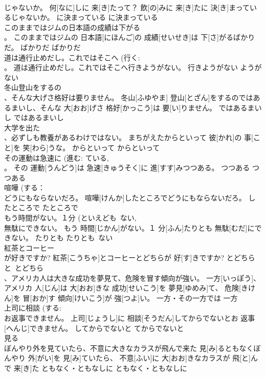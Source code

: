 \documentclass[8pt]{extreport}
\begin{document}
\begin{CJK}{UTF8}{min}
\\	じゃないか。	何[なに]しに 来[き]たって？ 飲[の]みに 来[き]たに 決[き]まっているじゃないか。	に決まっている	に決まっている	
\\	このままではジムの日本語の成績は下がる 
\\	。	このままではジムの 日本語[にほんご]の 成績[せいせき]は 下[さ]がるばかりだ。	ばかりだ	ばかりだ	
\\	道は通行止めだし。これではそこへ (行く: 
\\	。	道は通行止めだし。これではそこへ行きようがない。	行きようがない	ようがない	
\\	冬山登山をするの 
\\	、そんな大げさ格好は要りません。	冬山[ふゆやま] 登山[とざん]をするのではあるまいし、そんな 大[おお]げさ 格好[かっこう]は 要[い]りません。	ではあるまいし	ではあるまいし	
\\	大学を出た 
\\	、必ずしも教養があるわけではない。	まちがえたからといって 彼[かれ]の 事[こと]を 笑[わら]うな。	からといって	からといって	
\\	その運動は急速に (進む: ている, 
\\	。	その 運動[うんどう]は 急速[きゅうそく]に 進[すす]みつつある。	つつある	つつある	
\\	喧嘩 (する： 
\\	どうにもならないだろ。	喧嘩[けんか]したところでどうにもならないだろ。	したところで	たところで	
\\	もう時間がない。１分 (といえども~ない, 
\\	無駄にできない。	もう 時間[じかん]がない。１ 分[ふん]たりとも 無駄[むだ]にできない。	たりとも	たりとも~ない	
\\	紅茶とコーヒー 
\\	が好きですか?	紅茶[こうちゃ]とコーヒーとどちらが 好[す]きですか?	とどちら	と~とどちら	
\\	、アメリカ人は大きな成功を夢見て、危険を冒す傾向が強い。	一方[いっぽう]、アメリカ 人[じん]は 大[おお]きな 成功[せいこう]を 夢見[ゆめみ]て、 危険[きけん]を 冒[おか]す 傾向[けいこう]が 強[つよ]い。	一方・その一方では	一方	
\\	上司に相談 (する: 
\\	お返事できません。	上司[じょうし]に 相談[そうだん]してからでないとお 返事[へんじ]できません。	してからでないと	てからでないと	
\\	見る 
\\	ぼんやり外を見ていたら、不意に大きなカラスが飛んで来た	見[み]るともなくぼんやり 外[がい]を 見[み]ていたら、 不意[ふい]に 大[おお]きなカラスが 飛[と]んで 来[き]た	ともなく・ともなしに	ともなく・ともなしに	

\end{CJK}
\end{document}
